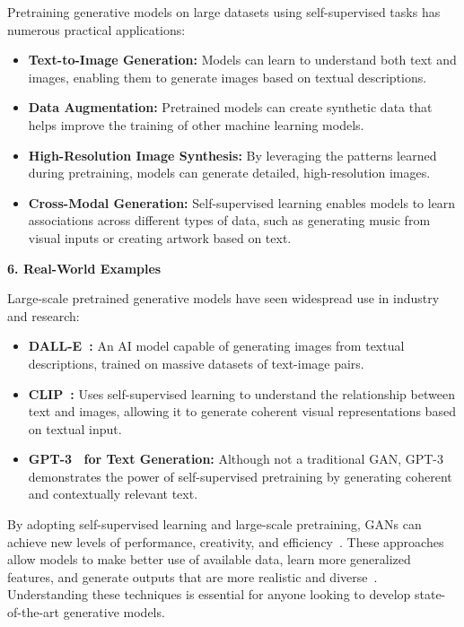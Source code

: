 Pretraining generative models on large datasets using self-supervised tasks has numerous practical applications:
\begin{itemize}
    \item \textbf{Text-to-Image Generation:} Models can learn to understand both text and images, enabling them to generate images based on textual descriptions.
    \item \textbf{Data Augmentation:} Pretrained models can create synthetic data that helps improve the training of other machine learning models.
    \item \textbf{High-Resolution Image Synthesis:} By leveraging the patterns learned during pretraining, models can generate detailed, high-resolution images.
    \item \textbf{Cross-Modal Generation:} Self-supervised learning enables models to learn associations across different types of data, such as generating music from visual inputs or creating artwork based on text.
\end{itemize}

\textbf{6. Real-World Examples}

Large-scale pretrained generative models have seen widespread use in industry and research:
\begin{itemize}
    \item \textbf{DALL-E~\cite{marcus2022very}:} An AI model capable of generating images from textual descriptions, trained on massive datasets of text-image pairs.
    \item \textbf{CLIP~\cite{radford2021learning}:} Uses self-supervised learning to understand the relationship between text and images, allowing it to generate coherent visual representations based on textual input.
    \item \textbf{GPT-3~\cite{brown2020language} for Text Generation:} Although not a traditional GAN, GPT-3 demonstrates the power of self-supervised pretraining by generating coherent and contextually relevant text.
\end{itemize}

By adopting self-supervised learning and large-scale pretraining, GANs can achieve new levels of performance, creativity, and efficiency~\cite{liu2021self}. These approaches allow models to make better use of available data, learn more generalized features, and generate outputs that are more realistic and diverse~\cite{brown2020language}. Understanding these techniques is essential for anyone looking to develop state-of-the-art generative models.

